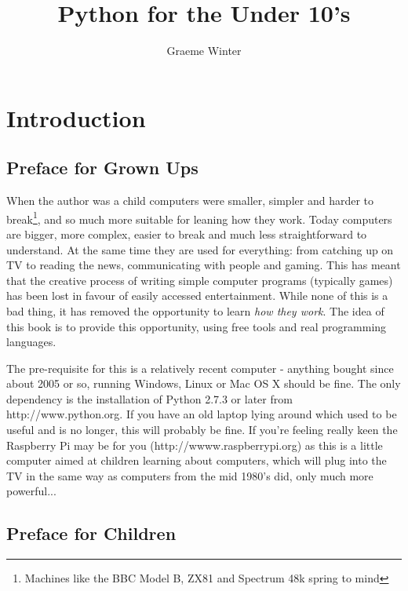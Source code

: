 \documentclass[a4paper, 11pt]{book}
\title{Python for the Under 10's}
\author{Graeme Winter}
\begin{document}
\maketitle
\clearpage
\thispagestyle{plain}
\par\vspace*{.35\textheight}{\centering For Emily, I hope you find
  this fun\par}
\chapter{Introduction}

\section{Preface for Grown Ups}

When the author was a child computers were smaller, simpler and harder to break\footnote{Machines like the BBC Model B, ZX81 and Spectrum 48k spring to mind}, and so much more suitable for leaning how they work. Today computers are bigger, more complex, easier to break and much less straightforward to understand. At the same time they are used for everything: from catching up on TV to reading the news, communicating with people and gaming. This has meant that the creative process of writing simple computer programs (typically games) has been lost in favour of easily accessed entertainment. While none of this is a bad thing, it has removed the opportunity to learn \emph{how they work}. The idea of this book is to provide this opportunity, using free tools and real programming languages. 

The pre-requisite for this is a relatively recent computer - anything bought since about 2005 or so, running Windows, Linux or Mac OS X should be fine. The only dependency is the installation of Python 2.7.3 or later from http://www.python.org. If you have an old laptop lying around which used to be useful and is no longer, this will probably be fine. If you're feeling really keen the Raspberry Pi may be for you (http://wwww.raspberrypi.org) as this is a little computer aimed at children learning about computers, which will plug into the TV in the same way as computers from the mid 1980's did, only much more powerful...

\section{Preface for Children}
\end{document}
